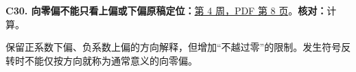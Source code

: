 \par\medskip\noindent\begin{minipage}{\linewidth}

\label{err:toward-zero}

\textbf{C30. 向零偏不能只看上偏或下偏}\quad\textbf{原稿定位：}\hyperref[src:w4p8]{第 4 周，PDF 第 8 页}。\quad\textbf{核对：}计算。\par

保留正系数下偏、负系数上偏的方向解释，但增加“不越过零”的限制。发生符号反转时不能仅按方向就称为通常意义的向零偏。

\end{minipage}\par
